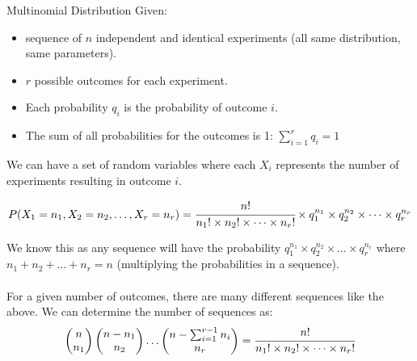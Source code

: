 \begin{definitionbox}{Multinomial Distribution}
Given:
\begin{itemize}
	\item sequence of $n$ independent and identical experiments (all same distribution, same parameters).
	\item $r$ possible outcomes for each experiment.
	\item Each probability $q_i$ is the probability of outcome $i$.
	\item The sum of all probabilities for the outcomes is 1: $\sum_{i=1}^r q_i = 1$
\end{itemize}
We can have a set of random variables where each $X_i$ represents the number of experiments resulting in outcome $i$.

\[P(X_1 = n_1, X_2 = n_2, \dots, X_r = n_r) = \cfrac{n!}{n_1! \times n_2! \times \dots \times n_r!} \times q_1^{n_1} \times q_2^{n_2} \times \dots \times  q_r^{n_r}\]

We know this as any sequence will have the probability $q_1^{n_1} \times q_2^{n_2} \times \dots \times q_r^{n_r}$ where $n_1 + n_2 + \dots + n_r = n$ (multiplying the probabilities in a sequence).
\\
\\ For a given number of outcomes, there are many different sequences like the above. We can determine the number of sequences as:
\[\begin{pmatrix}
		n \\ n_1
	\end{pmatrix} \begin{pmatrix}
		n - n_1 \\ n_2
	\end{pmatrix} \dots \begin{pmatrix}
		n - \sum_{i=1}^{r-1} n_i \\ n_r
	\end{pmatrix} = \cfrac{n!}{n_1! \times n_2! \times \dots \times n_r!}\]
\end{definitionbox}

